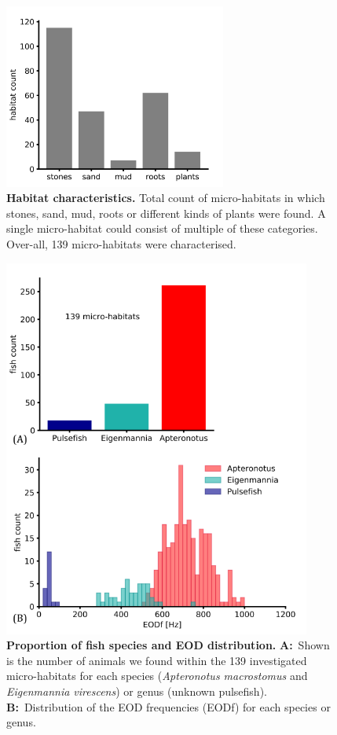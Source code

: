 \begin{figure}[H]
    \centering
    \includegraphics[width=0.65\textwidth]{pictures/Results/JULE_habitat_ccharacteristics.png}
    \caption{\textbf{Habitat characteristics.} Total count of micro-habitats in which stones, sand, mud, roots or different kinds of plants were found. A single micro-habitat could consist of multiple of these categories. Over-all, 139 micro-habitats were characterised.}
    \label{fig:habitat_count}
\end{figure}

\begin{figure}[H]
    \centering
    \includegraphics[width=0.9\textwidth]{pictures/Results/fish_count_EOD.png}
    \caption{\textbf{Proportion of fish species and EOD distribution.} \textbf{A:}~Shown is the number of animals we found within the 139 investigated micro-habitats for each species (\textit{Apteronotus macrostomus} and \textit{Eigenmannia virescens}) or genus (unknown pulsefish). \textbf{B:}~Distribution of the EOD frequencies (EODf) for each species or genus.}
    \label{fig:fish_count_eod}
\end{figure}


